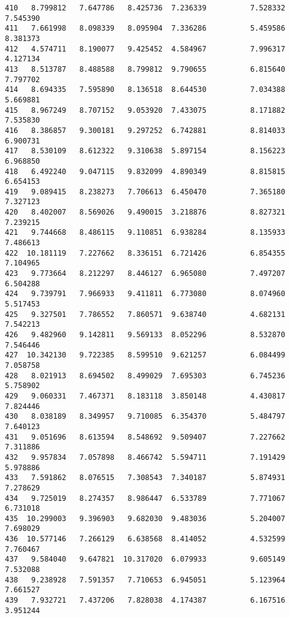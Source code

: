\documentclass[11pt]{article}
\begin{document}
\begin{Verbatim}[commandchars=\\\{\}]
410   8.799812   7.647786   8.425736  7.236339          7.528332      7.545390
411   7.661998   8.098339   8.095904  7.336286          5.459586      8.381373
412   4.574711   8.190077   9.425452  4.584967          7.996317      4.127134
413   8.513787   8.488588   8.799812  9.790655          6.815640      7.797702
414   8.694335   7.595890   8.136518  8.644530          7.034388      5.669881
415   8.967249   8.707152   9.053920  7.433075          8.171882      7.535830
416   8.386857   9.300181   9.297252  6.742881          8.814033      6.900731
417   8.530109   8.612322   9.310638  5.897154          8.156223      6.968850
418   6.492240   9.047115   9.832099  4.890349          8.815815      6.654153
419   9.089415   8.238273   7.706613  6.450470          7.365180      7.327123
420   8.402007   8.569026   9.490015  3.218876          8.827321      7.239215
421   9.744668   8.486115   9.110851  6.938284          8.135933      7.486613
422  10.181119   7.227662   8.336151  6.721426          6.854355      7.104965
423   9.773664   8.212297   8.446127  6.965080          7.497207      6.504288
424   9.739791   7.966933   9.411811  6.773080          8.074960      5.517453
425   9.327501   7.786552   7.860571  9.638740          4.682131      7.542213
426   9.482960   9.142811   9.569133  8.052296          8.532870      7.546446
427  10.342130   9.722385   8.599510  9.621257          6.084499      7.058758
428   8.021913   8.694502   8.499029  7.695303          6.745236      5.758902
429   9.060331   7.467371   8.183118  3.850148          4.430817      7.824446
430   8.038189   8.349957   9.710085  6.354370          5.484797      7.640123
431   9.051696   8.613594   8.548692  9.509407          7.227662      7.311886
432   9.957834   7.057898   8.466742  5.594711          7.191429      5.978886
433   7.591862   8.076515   7.308543  7.340187          5.874931      7.278629
434   9.725019   8.274357   8.986447  6.533789          7.771067      6.731018
435  10.299003   9.396903   9.682030  9.483036          5.204007      7.698029
436  10.577146   7.266129   6.638568  8.414052          4.532599      7.760467
437   9.584040   9.647821  10.317020  6.079933          9.605149      7.532088
438   9.238928   7.591357   7.710653  6.945051          5.123964      7.661527
439   7.932721   7.437206   7.828038  4.174387          6.167516      3.951244


\end{Verbatim}
\end{document}
